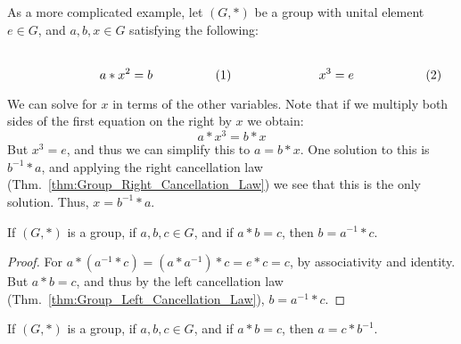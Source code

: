     \begin{example}
        As a more complicated example, let $(G,*)$ be a group with unital
        element $e\in{G}$, and $a,b,x\in{G}$ satisfying the following:
        \par
        \begin{subequations}
            \begin{minipage}[b]{0.49\textwidth}
                \centering
                \begin{equation}
                    a*x^{2}=b
                \end{equation}
            \end{minipage}
            \hfill
            \begin{minipage}[b]{0.49\textwidth}
                \centering
                \begin{equation}
                    x^{3}=e
                \end{equation}
            \end{minipage}
        \end{subequations}
        \par\vspace{2.5ex}
        We can solve for $x$ in terms of the other variables. Note that if we
        multiply both sides of the first equation on the right by $x$ we
        obtain:
        \begin{equation}
            a*x^{3}=b*x
        \end{equation}
        But $x^{3}=e$, and thus we can simplify this to $a=b*x$. One solution to
        this is $b^{\minus{1}}*a$, and applying the right cancellation law
        (Thm.~\ref{thm:Group_Right_Cancellation_Law}) we see that this is the
        only solution. Thus, $x=b^{\minus{1}}*a$.
    \end{example}
    \begin{theorem}
        \label{thm:Group_Simplifying_on_Left}%
        If $(G,*)$ is a group, if $a,b,c\in{G}$, and if $a*b=c$, then
        $b=a^{\minus{1}}*c$.
    \end{theorem}
    \begin{proof}
        For $a*(a^{\minus{1}}*c)=(a*a^{\minus{1}})*c=e*c=c$, by associativity
        and identity. But $a*b=c$, and thus by the left cancellation law
        (Thm.~\ref{thm:Group_Left_Cancellation_Law}), $b=a^{\minus{1}}*c$.
    \end{proof}
    \begin{theorem}
        \label{thm:Group_Simplifying_on_Right}%
        If $(G,*)$ is a group, if $a,b,c\in{G}$, and if $a*b=c$, then
        $a=c*b^{\minus{1}}$.
    \end{theorem}
